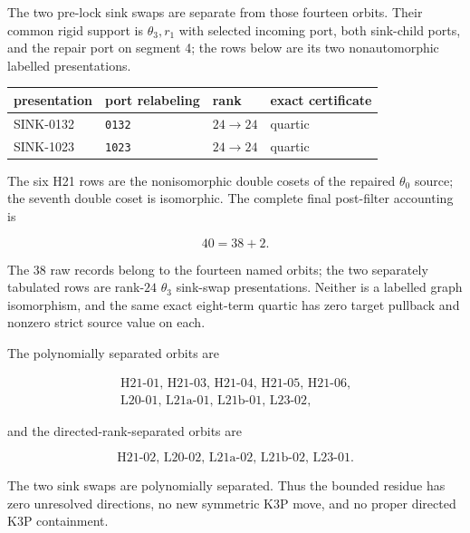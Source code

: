 The two pre-lock sink swaps are separate from those fourteen orbits.  Their
common rigid support is \(\theta_3,r_1\) with selected incoming port, both
sink-child ports, and the repair port on segment 4; the rows below are its
two nonautomorphic labelled presentations.

\begin{center}
\small
\begin{tabular}{llll}
\toprule
presentation & port relabeling & rank & exact certificate\\
\midrule
SINK-0132 & \texttt{0132} & \(24\to24\) & quartic\\
SINK-1023 & \texttt{1023} & \(24\to24\) & quartic\\
\bottomrule
\end{tabular}
\end{center}

The six H21 rows are the nonisomorphic double cosets of the repaired
\(\theta_0\) source; the seventh double coset is isomorphic.  The complete
final post-filter accounting is

\begin{equation}\label{eq:38plus2}
 \boxed{40=38+2.}
\end{equation}

The 38 raw records belong to the fourteen named orbits; the two separately
tabulated rows are rank-\(24\) \(\theta_3\) sink-swap presentations.  Neither is a
labelled graph isomorphism, and the same exact eight-term quartic has zero
target pullback and nonzero strict
source value on each.

\begin{theorem}\label{thm:fourteen}
The polynomially separated orbits are

\[
\begin{gathered}
\text{H21-01, H21-03, H21-04, H21-05, H21-06,}\\
\text{L20-01, L21a-01, L21b-01, L23-02},
\end{gathered}
\]

and the directed-rank-separated orbits are

\[
 \text{H21-02, L20-02, L21a-02, L21b-02, L23-01}.
\]

The two sink swaps are polynomially separated.  Thus the bounded residue has
zero unresolved directions, no new symmetric K3P move, and no proper
directed K3P containment.
\end{theorem}

